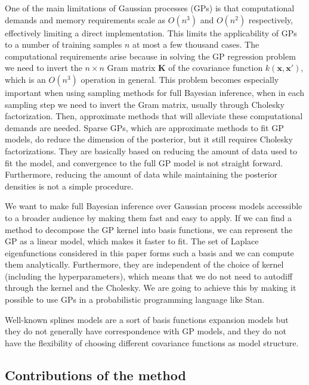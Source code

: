 \documentclass[]{interact}
\theoremstyle{plain}%
\theoremstyle{definition}
\theoremstyle{remark}
\begin{document}
One of the main limitations of Gaussian processes (GPs) \citep{rasmussen2006gaussian} is that computational demands and memory requirements scale as $O(n^3)$ and $O(n^2)$ respectively, effectively limiting a direct implementation. This limits the applicability of GPs to a number of training samples $n$ at most a few thousand cases. The computational requirements arise because in solving the GP regression problem we need to invert the $n \times n$ Gram matrix $\mathbf{K}$ of the covariance function $k(\mathbf{x},\mathbf{x}')$, which is an $O(n^3)$ operation in general. This problem becomes especially important when using sampling methods for full Bayesian inference, when in each sampling step we need to invert the Gram matrix, usually through Cholesky factorization. Then, approximate methods that will alleviate these computational demands are needed. Sparse GPs, which are approximate methods to fit GP models, do reduce the dimension of the posterior, but it still requires Cholesky factorizations. 
They are basically based on reducing the amount of data used to fit the model, and convergence to the full GP model is not straight forward. Furthermore, reducing the amount of data while maintaining the posterior densities is not a simple procedure.

We want to make full Bayesian inference over Gaussian process models accessible to a broader audience by making them fast and easy to apply. If we can find a method to decompose the GP kernel into basis functions, we can represent the GP as a linear model, which makes it faster to fit. The set of Laplace eigenfunctions considered in this paper forms such a basis and we can compute them analytically. Furthermore, they are independent of the choice of kernel (including the hyperparameters), which means that we do not need to autodiff through the kernel and the Cholesky. We are going to achieve this by making it possible to use GPs in a probabilistic programming language like Stan.

Well-known splines models are a sort of basis functions expansion models but they do not generally have correspondence with GP models, and they do not have the flexibility of choosing different covariance functions as model structure.  

\subsection{Contributions of the method}
\end{document}
